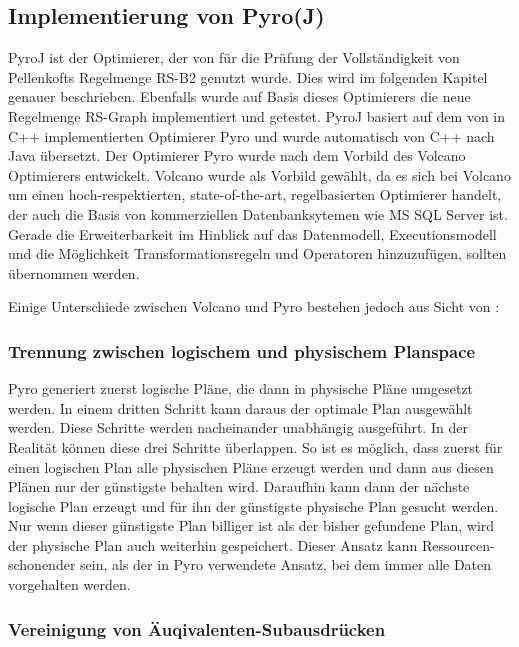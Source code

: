 \subsection{Implementierung von Pyro(J)}
\label{sec:pyroJ}
PyroJ ist der Optimierer, der von \cite{shanbhag2014optimizing} für die Prüfung der Vollständigkeit von Pellenkofts Regelmenge RS-B2 genutzt wurde. Dies wird im folgenden Kapitel genauer beschrieben. Ebenfalls wurde auf Basis dieses Optimierers die neue Regelmenge RS-Graph implementiert und getestet. 
PyroJ basiert auf dem von \cite{roy2001multi} in C++ implementierten Optimierer Pyro und wurde automatisch von C++ nach Java übersetzt. Der Optimierer Pyro wurde nach dem Vorbild des Volcano Optimierers entwickelt. Volcano wurde als Vorbild gewählt, da es sich bei Volcano um einen hoch-respektierten, state-of-the-art, regelbasierten Optimierer handelt, der auch die Basis von kommerziellen Datenbanksytemen wie MS SQL Server ist. Gerade die Erweiterbarkeit im Hinblick auf das Datenmodell, Executionsmodell und die Möglichkeit Transformationsregeln und Operatoren hinzuzufügen, sollten übernommen werden.


Einige Unterschiede zwischen Volcano und Pyro bestehen jedoch aus Sicht von \cite{roy2001multi}:

\subsubsection{Trennung zwischen logischem und physischem Planspace}

Pyro generiert zuerst logische Pläne, die dann in physische Pläne umgesetzt werden. In einem dritten Schritt kann daraus der optimale Plan ausgewählt werden. Diese Schritte werden nacheinander unabhängig ausgeführt. In der Realität können diese drei Schritte überlappen. So ist es möglich, dass zuerst für einen logischen Plan alle physischen Pläne erzeugt werden und dann aus diesen Plänen nur der günstigste behalten wird. Daraufhin kann dann der nächste logische Plan erzeugt und für ihn der günstigste physische Plan gesucht werden. Nur wenn dieser günstigste Plan billiger ist als der bisher gefundene Plan, wird der physische Plan auch weiterhin gespeichert. Dieser Ansatz kann Ressourcen-schonender sein, als der in Pyro verwendete Ansatz, bei dem immer alle Daten vorgehalten werden. 

\subsubsection{Vereinigung von Äuqivalenten-Subausdrücken}

